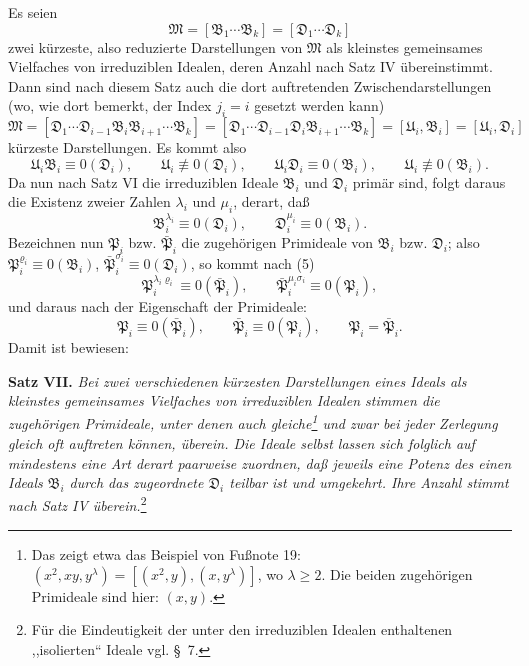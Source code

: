 \documentclass[11pt]{article}
\newcommand{\ideal}[1]{\mathfrak{#1}}
\begin{document}
Es seien
\[
 \ideal M=[\ideal B_1\cdots\ideal B_k]=[\ideal D_1\cdots\ideal D_k]
\]
zwei kürzeste, also reduzierte Darstellungen von $\ideal M$ als kleinstes gemeinsames Vielfaches von irreduziblen Idealen, deren Anzahl nach Satz IV übereinstimmt. Dann sind nach diesem Satz auch die dort auftretenden Zwischendarstellungen (wo, wie dort bemerkt, der Index $j_i=i$ gesetzt werden kann)
\[
 \ideal M=[\ideal D_1\cdots\ideal D_{i-1}\ideal B_i\ideal B_{i+1}\cdots\ideal B_k]
       =[\ideal D_1\cdots\ideal D_{i-1}\ideal D_i\ideal B_{i+1}\cdots\ideal B_k]
       =[\ideal U_i,\ideal B_i]=[\ideal U_i,\ideal D_i]
\]
kürzeste Darstellungen. Es kommt also
\[
 \ideal U_i\ideal B_i\equiv0(\ideal D_i),\qquad \ideal U_i\not\equiv0(\ideal D_i),
 \qquad
 \ideal U_i\ideal D_i\equiv0(\ideal B_i),\qquad \ideal U_i\not\equiv0(\ideal B_i).
\]
Da nun nach Satz VI die irreduziblen Ideale $\ideal B_i$ und $\ideal D_i$ primär sind, folgt daraus die Existenz zweier Zahlen $\lambda_i$ und $\mu_i$, derart, daß
\begin{equation}
 \ideal B_i^{\lambda_i}\equiv0(\ideal D_i),
 \qquad
 \ideal D_i^{\mu_i}\equiv0(\ideal B_i).
\tag{5}
\end{equation}
Bezeichnen nun $\ideal P_i$ bzw. $\bar{\ideal P}_i$ die zugehörigen Primideale von $\ideal B_i$ bzw. $\ideal D_i$; also $\ideal P_i^{\varrho_i}\equiv0(\ideal B_i)$, $\bar{\ideal P}_i^{\sigma_i}\equiv0(\ideal D_i)$, so kommt nach (5)
\[
 \ideal P_i^{\lambda_i\varrho_i}\equiv0(\bar{\ideal P}_i),
 \qquad
 \bar{\ideal P}_i^{\mu_i\sigma_i}\equiv0(\ideal P_i),
\]
und daraus nach der Eigenschaft der Primideale:
\[
 \ideal P_i\equiv0(\bar{\ideal P}_i),
 \qquad
 \bar{\ideal P}_i\equiv0(\ideal P_i),
 \qquad
 \ideal P_i=\bar{\ideal P}_i.
\]
Damit ist bewiesen:

\textbf{Satz VII.} \emph{Bei zwei verschiedenen kürzesten Darstellungen eines Ideals als kleinstes gemeinsames Vielfaches von irreduziblen Idealen stimmen die zugehörigen Primideale, unter denen auch gleiche\footnote{Das zeigt etwa das Beispiel von Fußnote 19: $(x^2,xy,y^\lambda)=[(x^2,y),(x,y^\lambda)]$, wo $\lambda\ge2$. Die beiden zugehörigen Primideale sind hier: $(x,y)$.} und zwar bei jeder Zerlegung gleich oft auftreten können, überein. Die Ideale selbst lassen sich folglich auf mindestens eine Art derart paarweise zuordnen, daß jeweils eine Potenz des einen Ideals $\ideal B_i$ durch das zugeordnete $\ideal D_i$ teilbar ist und umgekehrt. Ihre Anzahl stimmt nach Satz IV überein.}\footnote{Für die Eindeutigkeit der unter den irreduziblen Idealen enthaltenen ,,isolierten`` Ideale vgl. \S~7.}
\end{document}
